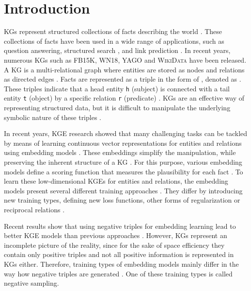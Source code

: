 \chapter{Introduction}
\label{ch:introduction}

\acp{KG} represent structured collections of facts describing the world  \cite{hogan2020knowledge}.
These collections of facts have been used in a wide range of applications, such as question answering, structured search \cite{zhang2019nscaching}, and link prediction \cite{cai2017kbgan, Alam2020AffinityDN}.
In recent years, numerous \acp{KG} such as \textsc{FB15K}, \textsc{WN18}, \textsc{YAGO} \cite{ConEx} and \textsc{WikiData} \cite{arnaoutwikinegata} have been released.
A \ac{KG} is a multi-relational graph where entities are stored as nodes and relations as directed edges \cite{zhang2019nscaching}.
Facts are represented as a triple in the form of , denoted as .
These triples indicate that a head entity \texttt{h} (subject) is connected with a tail entity \texttt{t} (object) by a specific relation \texttt{r} (predicate) \cite{zhang2019nscaching, Alam2020AffinityDN}.
\acp{KG} are an effective way of representing structured data, but it is difficult to manipulate the underlying symbolic nature of these triples \cite{8047276}.

In recent years, \ac{KGE} research showed that many challenging tasks can be tackled by means of learning continuous vector representations for entities and relations using embedding models \cite{Alam2020AffinityDN}.
These embeddings simplify the manipulation, while preserving the inherent structure of a \ac{KG} \cite{8047276}. 
For this purpose, various embedding models define a scoring function that measures the plausibility for each fact \cite{8047276, ConvE, qiannegative}.
To learn these low-dimensional \acp{KGE} for entities and relations, the embedding models present several different training approaches \cite{Ruffinelli2020You}.
They differ by introducing new training types, defining new loss functions, other forms of regularization or reciprocal relations \cite{Ruffinelli2020You}.

Recent results show that using negative triples for embedding learning lead to better \ac{KGE} models than previous approaches \cite{kotnis2017analysis}.
However, \acp{KG} represent an incomplete picture of the reality, since for the sake of space efficiency they contain only positive triples \cite{qiannegative} and not all positive information is represented in \acp{KG} either.
Therefore, training types of embedding models mainly differ in the way how negative triples are generated \cite{Ruffinelli2020You}. 
One of these training types is called negative sampling.
\clearpage

%

%

%

%
